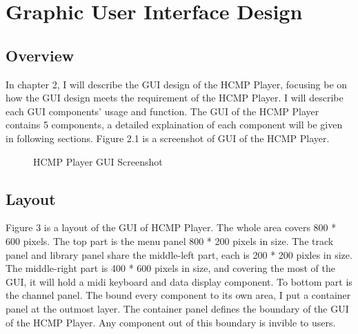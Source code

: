 
\chapter{Graphic User Interface Design} %

\section{Overview}
In chapter 2, I will describe the GUI design of the HCMP Player, focusing 
be on how the GUI design meets the requirement of the HCMP Player. I will describe
each GUI components' 
usage and function. The GUI of the HCMP Player contains 5 components, 
a detailed explaination of each component will be given in following sections. 
Figure 2.1 is a screenshot of GUI of the HCMP Player. 

\begin{figure}[H]
\caption{HCMP Player GUI Screenshot}
\label{fig:speciation}
\end{figure}

\section{Layout}
Figure 3 is a layout of the GUI of HCMP Player. The whole area 
covers 800 * 600 pixels. The top part is the menu panel 800 * 200 pixels in size. 
The track panel and 
library panel share the middle-left part, each is 200 * 200 pixles in size. 
The middle-right part is 400 * 600 pixels in size, and covering the most of the GUI, 
it will hold a midi keyboard and data display component. To bottom part is the channel   
panel. The bound every component to its own area, I put a container panel at the outmost 
layer. The container panel defines the boundary of the GUI of the HCMP Player. Any 
component out of this boundary is invible to users. 

